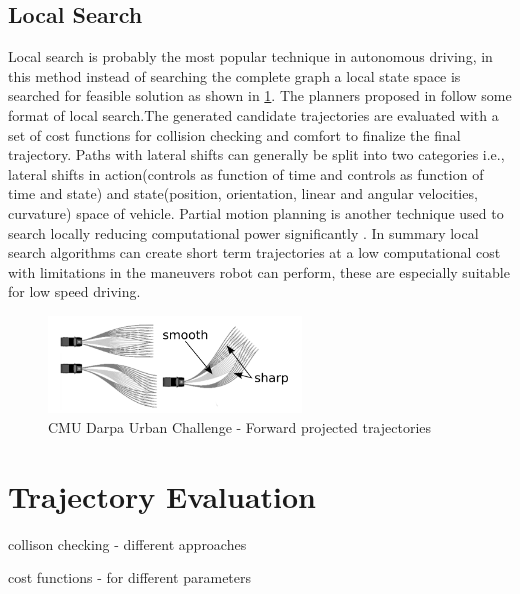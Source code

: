 \subsection{Local Search}
\label{rw_local_search}

Local search is probably the most popular technique in autonomous driving, in this method instead of searching the complete graph a local state space is searched for feasible solution as shown in \ref{cmubossduc}. The planners proposed in \cite{darpa_urban_challenge} \cite{juniorstanford} \cite{kolski_thesis} \cite{Broggi2012} \cite{real_time_traj_plan_article} \cite{urbansafetyeth} follow some format of local search.The generated candidate trajectories are evaluated with a set of cost functions for collision checking and comfort to finalize the final trajectory. Paths with lateral shifts can generally be split into two categories i.e., lateral shifts in action(controls as function of time and controls as function of time and state) and state(position, orientation, linear and angular velocities, curvature) space of vehicle\cite{howard_phd}. Partial motion planning is another technique used to search locally reducing computational power significantly \cite{partialmotionplanning}. In summary local search algorithms can create short term trajectories at a low computational cost with limitations in the maneuvers robot can perform, these are especially suitable for low speed driving.  

\begin{figure}
	\centering
	\includegraphics[width=0.6\textwidth]{Images/related_work/trajectorysetbossduc.png}
	\caption{CMU Darpa Urban Challenge - Forward projected trajectories}
	\label{cmubossduc}
\end{figure} 








\section{Trajectory Evaluation}
\label{traj_eval}

collison checking - different approaches 

cost functions - for different parameters


